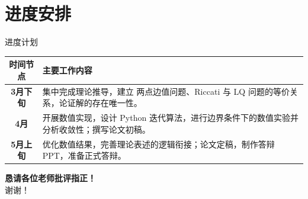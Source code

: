 \documentclass[aspectratio=169, 10pt]{ctexbeamer}
\begin{document}
	\section{进度安排}
	
	\begin{frame}{进度计划}
		\begin{table}[]
			\centering
			\renewcommand{\arraystretch}{1.5}
			\begin{tabular}{cp{}}
				\toprule
				\textbf{\textcolor{AcademicBlue}{时间节点}} & \textbf{\textcolor{AcademicBlue}{主要工作内容}} \\
				\midrule
				\textbf{3月下旬} & 集中完成理论推导，建立 两点边值问题、Riccati 与 LQ 问题的等价关系，论证解的存在唯一性。 \\
				\textbf{4月} & 开展数值实现，设计 Python 迭代算法，进行边界条件下的数值实验并分析收敛性；撰写论文初稿。 \\
				\textbf{5月上旬} & 优化数值结果，完善理论表述的逻辑衔接；论文定稿，制作答辩 PPT，准备正式答辩。 \\
				\bottomrule
			\end{tabular}
		\end{table}
	\end{frame}
	
	\begin{frame}[plain]
		\begin{center}
			\Huge{\textbf{\textcolor{AcademicBlue}{恳请各位老师批评指正！}}} \\
			\vspace{1cm}
			\Large{谢谢！}
		\end{center}
	\end{frame}
	
\end{document}
